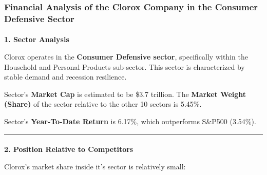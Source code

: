 \documentclass[
  letterpaper,
  DIV=11,
  numbers=noendperiod]{scrartcl}
\makeatletter
\let\oldparagraph\paragraph
\renewcommand{\paragraph}{
    \@ifstar
      \xxxParagraphStar
      \xxxParagraphNoStar
  }
\newcommand{\xxxParagraphStar}[1]{\oldparagraph*{#1}\mbox{}}
\newcommand{\xxxParagraphNoStar}[1]{\oldparagraph{#1}\mbox{}}
\makeatother
\begin{document}
\subsubsection{Financial Analysis of the Clorox Company in the Consumer
Defensive
Sector}\label{financial-analysis-of-the-clorox-company-in-the-consumer-defensive-sector}

\paragraph{\texorpdfstring{\textbf{1. Sector
Analysis}}{1. Sector Analysis}}\label{sector-analysis-1}

Clorox operates in the \textbf{Consumer Defensive sector}, specifically
within the Household and Personal Products sub-sector. This sector is
characterized by stable demand and recession resilience.

Sector's \textbf{Market Cap} is estimated to be \$3.7 trillion. The
\textbf{Market Weight (Share)} of the sector relative to the other 10
sectors is 5.45\%.

Sector's \textbf{Year-To-Date Return} is 6.17\%, which outperforms
S\&P500 (3.54\%).

\begin{center}\rule{0.5\linewidth}{0.5pt}\end{center}

\paragraph{\texorpdfstring{\textbf{2. Position Relative to
Competitors}}{2. Position Relative to Competitors}}\label{position-relative-to-competitors}

Clorox's market share inside it's sector is relatively small:
\end{document}
